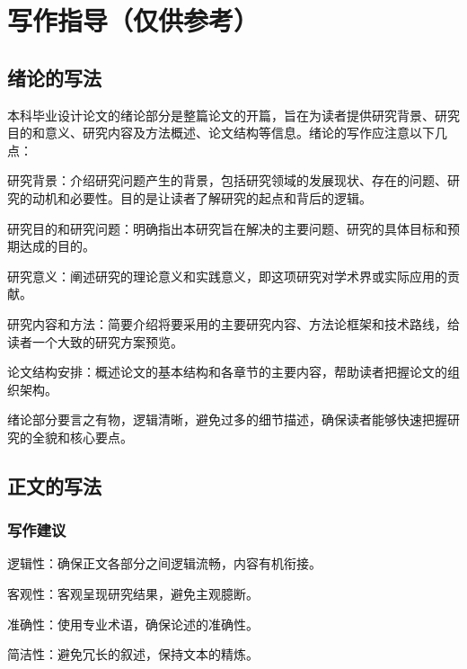 \newpage
\setcounter{page}{1}        %

\chapter{写作指导（仅供参考）}              %
\section{绪论的写法}     %

本科毕业设计论文的绪论部分是整篇论文的开篇，旨在为读者提供研究背景、研究目的和意义、研究内容及方法概述、论文结构等信息。绪论的写作应注意以下几点：

研究背景：介绍研究问题产生的背景，包括研究领域的发展现状、存在的问题、研究的动机和必要性。目的是让读者了解研究的起点和背后的逻辑。

研究目的和研究问题：明确指出本研究旨在解决的主要问题、研究的具体目标和预期达成的目的。

研究意义：阐述研究的理论意义和实践意义，即这项研究对学术界或实际应用的贡献。

研究内容和方法：简要介绍将要采用的主要研究内容、方法论框架和技术路线，给读者一个大致的研究方案预览。

论文结构安排：概述论文的基本结构和各章节的主要内容，帮助读者把握论文的组织架构。

绪论部分要言之有物，逻辑清晰，避免过多的细节描述，确保读者能够快速把握研究的全貌和核心要点。

\section{正文的写法}    %

\subsection{写作建议}   %

逻辑性：确保正文各部分之间逻辑流畅，内容有机衔接。

客观性：客观呈现研究结果，避免主观臆断。

准确性：使用专业术语，确保论述的准确性。

简洁性：避免冗长的叙述，保持文本的精炼。
